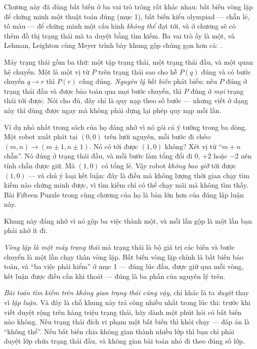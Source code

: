 \documentclass[../../algorithm.tex]{subfiles}
\begin{document}
Chương này đã dùng bất biến ở ba vai trò trông rất khác nhau: bất biến vòng lặp để chứng minh một thuật toán đúng (mục 1), bất biến kiểu olympiad --- chẵn lẻ, tô màu --- để chứng minh một cấu hình \emph{không thể} đạt tới, và ở chương  sẽ có thêm đồ thị trạng thái mà ta duyệt bằng tìm kiếm. Ba vai trò ấy là một, và Lehman, Leighton cùng Meyer\cite{mcs2018} trình bày khung gộp chúng gọn hơn cả: .

Máy trạng thái gồm ba thứ: một tập trạng thái, một trạng thái đầu, và một quan hệ chuyển. Một  là một vị từ \(P\) trên trạng thái sao cho hễ \(P(q)\) đúng và có bước chuyển \(q \rightarrow r\) thì \(P(r)\) cũng đúng. \emph{Nguyên lý bất biến} phát biểu: nếu \(P\) đúng ở trạng thái đầu và được bảo toàn qua mọi bước chuyển, thì \(P\) đúng ở \emph{mọi} trạng thái tới được. Nói cho đủ, đây chỉ là quy nạp theo số bước --- nhưng viết ở dạng này thì dùng được ngay mà không phải dựng lại phép quy nạp mỗi lần.

Ví dụ nhỏ nhất trong sách của họ đáng nhớ vì nó gói cả ý tưởng trong ba dòng. Một robot xuất phát tại \((0,0)\) trên lưới nguyên, mỗi bước đi chéo: \((m,n) \rightarrow (m\pm 1, n\pm 1)\). Nó có tới được \((1,0)\) không? Xét vị từ ``\(m+n\) chẵn''. Nó đúng ở trạng thái đầu, và mỗi bước làm tổng đổi đi \(0\), \(+2\) hoặc \(-2\) nên tính chẵn được giữ. Mà \((1,0)\) có tổng lẻ. Vậy robot \emph{không bao giờ} tới được \((1,0)\) --- và chú ý loại kết luận: đây là điều mà không lượng thời gian chạy tìm kiếm nào chứng minh được, vì tìm kiếm chỉ có thể chạy mãi mà không tìm thấy. Bài Fifteen Puzzle trong cùng chương của họ là bản lớn hơn của đúng lập luận này.

Khung này đáng nhớ vì nó gộp ba việc thành một, và mỗi lần gộp là một lần bạn phải nhớ ít đi.

\emph{Vòng lặp là một máy trạng thái} mà trạng thái là bộ giá trị các biến và bước chuyển là một lần chạy thân vòng lặp. Bất biến vòng lặp chính là bất biến bảo toàn, và ``ba việc phải kiểm'' ở mục 1 --- đúng lúc đầu, được giữ qua mỗi vòng, kết luận được điều cần khi thoát --- đúng là ba phần của nguyên lý trên.

\emph{Bài toán tìm kiếm trên không gian trạng thái cũng vậy}, chỉ khác là ta \emph{duyệt} thay vì \emph{lập luận}. Và đây là chỗ khung này trả công nhiều nhất trong lúc thi: trước khi viết duyệt rộng trên hàng triệu trạng thái, hãy dành một phút hỏi có bất biến nào không. Nếu trạng thái đích vi phạm một bất biến thì khỏi chạy --- đáp án là ``không thể''. Nếu bất biến chia không gian thành nhiều lớp thì bạn chỉ phải duyệt lớp chứa trạng thái đầu, và không gian bài toán nhỏ đi theo đúng số lớp.
\end{document}
